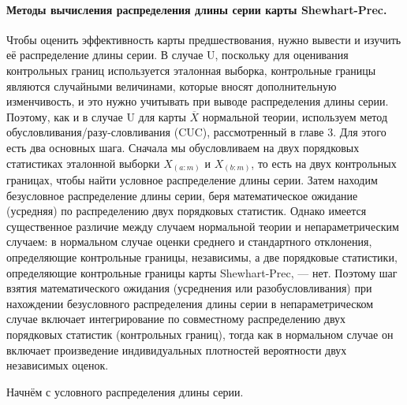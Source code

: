 \paragraph{Методы вычисления распределения длины серии карты Shewhart-Prec.} Чтобы оценить эффективность карты предшествования, нужно вывести и изучить её распределение длины серии. В случае U, поскольку для оценивания контрольных границ используется эталонная выборка, контрольные границы являются случайными величинами, которые вносят дополнительную изменчивость, и это нужно учитывать при выводе распределения длины серии. Поэтому, как и в случае U для карты \(\overline{X}\) нормальной теории, используем метод обусловливания/разу-словливания (CUC), рассмотренный в главе 3. Для этого есть два основных шага. Сначала мы обусловливаем на двух порядковых статистиках эталонной выборки \(X_{(a:m)}\) и \(X_{(b:m)}\), то есть на двух контрольных границах, чтобы найти условное распределение длины серии. Затем находим безусловное распределение длины серии, беря математическое ожидание (усредняя) по распределению двух порядковых статистик. Однако имеется существенное различие между случаем нормальной теории и непараметрическим случаем: в нормальном случае оценки среднего и стандартного отклонения, определяющие контрольные границы, независимы, а две порядковые статистики, определяющие контрольные границы карты Shewhart-Prec, --- нет. Поэтому шаг взятия математического ожидания (усреднения или разобусловливания) при нахождении безусловного распределения длины серии в непараметрическом случае включает интегрирование по совместному распределению двух порядковых статистик (контрольных границ), тогда как в нормальном случае он включает произведение индивидуальных плотностей вероятности двух независимых оценок.

Начнём с условного распределения длины серии.

